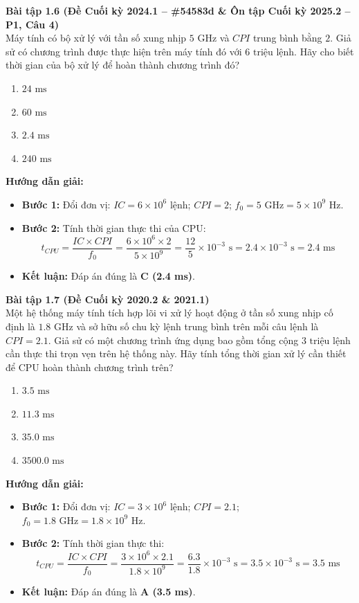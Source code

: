 \textbf{Bài tập 1.6 (Đề Cuối kỳ 2024.1 -- \#54583d \& Ôn tập Cuối kỳ 2025.2 -- P1, Câu 4)}\\
Máy tính có bộ xử lý với tần số xung nhịp $5\text{ GHz}$ và $CPI$ trung bình bằng $2$. Giả sử có chương trình được thực hiện trên máy tính đó với $6\text{ triệu lệnh}$. Hãy cho biết thời gian của bộ xử lý để hoàn thành chương trình đó?
\begin{enumerate}[label=\Alph*.]
    \item $24\text{ ms}$
    \item $60\text{ ms}$
    \item $2.4\text{ ms}$
    \item $240\text{ ms}$
\end{enumerate}
\textbf{Hướng dẫn giải:}
\begin{itemize}
    \item \textbf{Bước 1:} Đổi đơn vị: $IC = 6 \times 10^6\text{ lệnh}$; $CPI = 2$; $f_0 = 5\text{ GHz} = 5 \times 10^9\text{ Hz}$.
    \item \textbf{Bước 2:} Tính thời gian thực thi của CPU:
    $$t_{CPU} = \frac{IC \times CPI}{f_0} = \frac{6 \times 10^6 \times 2}{5 \times 10^9} = \frac{12}{5} \times 10^{-3}\text{ s} = 2.4 \times 10^{-3}\text{ s} = 2.4\text{ ms}$$
    \item \textbf{Kết luận:} Đáp án đúng là \textbf{C (2.4 ms)}.
\end{itemize}

\textbf{Bài tập 1.7 (Đề Cuối kỳ 2020.2 \& 2021.1)}\\
Một hệ thống máy tính tích hợp lõi vi xử lý hoạt động ở tần số xung nhịp cố định là $1.8\text{ GHz}$ và sở hữu số chu kỳ lệnh trung bình trên mỗi câu lệnh là $CPI = 2.1$. Giả sử có một chương trình ứng dụng bao gồm tổng cộng $3\text{ triệu lệnh}$ cần thực thi trọn vẹn trên hệ thống này. Hãy tính tổng thời gian xử lý cần thiết để CPU hoàn thành chương trình trên?
\begin{enumerate}[label=\Alph*.]
    \item $3.5\text{ ms}$
    \item $11.3\text{ ms}$
    \item $35.0\text{ ms}$
    \item $3500.0\text{ ms}$
\end{enumerate}
\textbf{Hướng dẫn giải:}
\begin{itemize}
    \item \textbf{Bước 1:} Đổi đơn vị: $IC = 3 \times 10^6\text{ lệnh}$; $CPI = 2.1$; $f_0 = 1.8\text{ GHz} = 1.8 \times 10^9\text{ Hz}$.
    \item \textbf{Bước 2:} Tính thời gian thực thi:
    $$t_{CPU} = \frac{IC \times CPI}{f_0} = \frac{3 \times 10^6 \times 2.1}{1.8 \times 10^9} = \frac{6.3}{1.8} \times 10^{-3}\text{ s} = 3.5 \times 10^{-3}\text{ s} = 3.5\text{ ms}$$
    \item \textbf{Kết luận:} Đáp án đúng là \textbf{A (3.5 ms)}.
\end{itemize}

